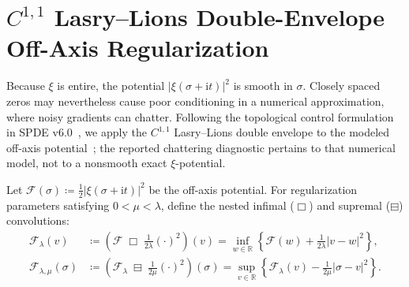 \documentclass[11pt,a4paper,reqno]{article}
\theoremstyle{plain}
\theoremstyle{definition}
\theoremstyle{remark}
\numberwithin{equation}{section}
\begin{document}
\section{\texorpdfstring{$C^{1,1}$}{C1,1} Lasry--Lions Double-Envelope Off-Axis Regularization}
\label{sec:lasry_lions}

Because $\xi$ is entire, the potential $|\xi(\sigma+\mathrm{i}t)|^2$ is smooth in $\sigma$. Closely spaced zeros may nevertheless cause poor conditioning in a numerical approximation, where noisy gradients can chatter. Following the topological control formulation in SPDE v6.0~\cite{SPDEV60}, we apply the $C^{1,1}$ Lasry--Lions double envelope to the modeled off-axis potential~\cite{lasry1986remarks, attouch1993approximation}; the reported chattering diagnostic pertains to that numerical model, not to a nonsmooth exact $\xi$-potential.

Let $\mathcal{F}(\sigma) \coloneqq \frac{1}{2} |\xi(\sigma + \mathrm{i}t)|^2$ be the off-axis potential. For regularization parameters satisfying $0 < \mu < \lambda$, define the nested infimal ($\Box$) and supremal ($\boxminus$) convolutions:
\begin{align}
  \mathcal{F}_\lambda(v) &\coloneqq \left( \mathcal{F} \;\Box\; \frac{1}{2\lambda}(\cdot)^2 \right)(v) = \inf_{w \in \mathbb{R}} \left\{ \mathcal{F}(w) + \frac{1}{2\lambda}|v - w|^2 \right\}, \\
  \mathcal{F}_{\lambda,\mu}(\sigma) &\coloneqq \left( \mathcal{F}_\lambda \;\boxminus\; \frac{1}{2\mu}(\cdot)^2 \right)(\sigma) = \sup_{v \in \mathbb{R}} \left\{ \mathcal{F}_\lambda(v) - \frac{1}{2\mu}|\sigma - v|^2 \right\}.
\end{align}
\end{document}
